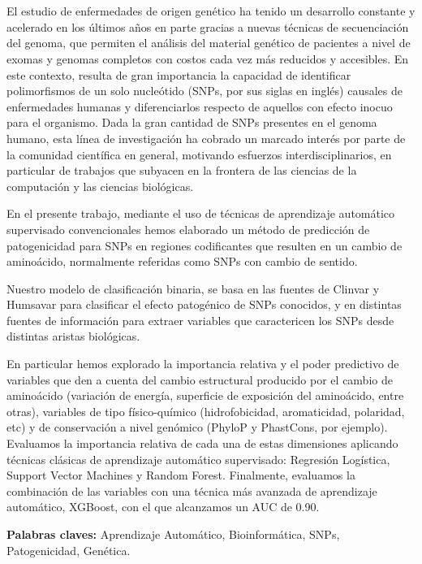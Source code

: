 \chapter*{\runtitulo}

\noindent El estudio de enfermedades de origen genético ha tenido un desarrollo constante y acelerado en los últimos años en parte gracias a nuevas técnicas de secuenciación del genoma, que permiten el análisis del material genético de pacientes a nivel de exomas y genomas completos con costos cada vez más reducidos y accesibles. En este contexto, resulta de gran importancia la capacidad de identificar polimorfismos de un solo nucleótido (SNPs, por sus siglas en inglés) causales de enfermedades humanas y diferenciarlos respecto de aquellos con efecto inocuo para el organismo. Dada la gran cantidad de SNPs presentes en el genoma humano, esta línea de investigación ha cobrado un marcado interés por parte de la comunidad científica en general, motivando esfuerzos interdisciplinarios, en particular de trabajos que subyacen en la frontera de las ciencias de la computación y las ciencias biológicas.

En el presente trabajo, mediante el uso de técnicas de aprendizaje automático supervisado convencionales hemos elaborado un método de predicción de patogenicidad para SNPs en regiones codificantes que resulten en un cambio de aminoácido, normalmente referidas como SNPs con cambio de sentido.

Nuestro modelo de clasificación binaria, se basa en las fuentes de Clinvar y Humsavar para clasificar el efecto patogénico de SNPs conocidos, y en distintas fuentes de información para extraer variables que caractericen los SNPs desde distintas aristas biológicas.
 
En particular hemos explorado la importancia relativa y el poder predictivo de variables que den a cuenta del cambio estructural producido por el cambio de aminoácido (variación de energía, superficie de exposición del aminoácido, entre otras), variables de tipo físico-químico (hidrofobicidad, aromaticidad, polaridad, etc) y de conservación a nivel genómico (PhyloP y PhastCons, por ejemplo). Evaluamos la importancia relativa de cada una de estas dimensiones aplicando técnicas clásicas de aprendizaje automático supervisado: Regresión Logística, Support Vector Machines y Random Forest. Finalmente, evaluamos la combinación de las variables con una técnica más avanzada de aprendizaje automático, XGBoost, con el que alcanzamos un AUC de 0.90.



\bigskip

\noindent\textbf{Palabras claves:} Aprendizaje Automático, Bioinformática, SNPs, Patogenicidad, Genética.


